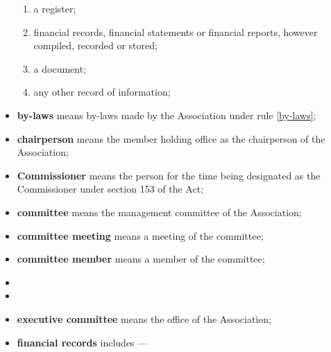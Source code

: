 \documentclass[../constitution.tex]{subfiles}
\begin{document}
\begin{itemize}[label={-}]
\begin{enumerate}
  \item a register;
  \item financial records, financial statements or financial reports, however compiled, recorded or stored;
  \item a document;
  \item any other record of information;
  \end{enumerate}
\item \textbf{by-laws} means by-laws made by the Association under rule \ref{by-laws};
\item \textbf{chairperson} means the  member holding office as the chairperson of the Association;
\item \textbf{Commissioner} means the person for the time being designated as the Commissioner under section 153 of the Act;
\item \textbf{committee} means the management committee of the Association;
\item \textbf{committee meeting} means a meeting of the committee;
\item \textbf{committee member} means a member of the committee;
\item {}
\item {}
\item \textbf{executive committee} means the office  of the Association; 
\item \textbf{financial records} includes ---

  \begin{enumerate}
    \def\labelenumi{\alph{enumi})}
    \setcounter{enumi}{0}
  

\end{enumerate}
\end{itemize}
\end{document}
